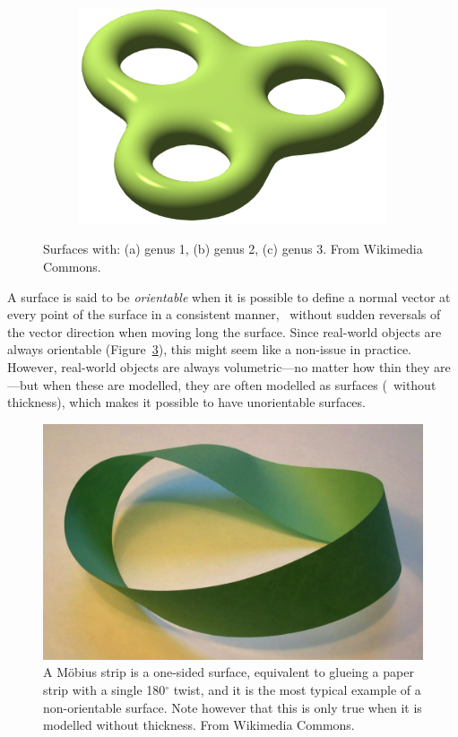 \begin{figure}
\quad
\begin{subfigure}[b]{0.3\linewidth}
\includegraphics[width=\linewidth]{figs/genus3}
\caption{}%
\label{subfig:genus3}
\end{subfigure}
\caption{Surfaces with: (a) genus 1, (b) genus 2, (c) genus 3. From Wikimedia Commons.}%
\label{fig:genus}
\end{figure}

A surface is said to be \emph{orientable} when it is possible to define a normal vector at every point of the surface in a consistent manner, \ie\ without sudden reversals of the vector direction when moving long the surface.
Since real-world objects are always orientable (Figure~\ref{fig:mobius}), this might seem like a non-issue in practice.
However, real-world objects are always volumetric---no matter how thin they are---but when these are modelled, they are often modelled as surfaces (\ie\ without thickness), which makes it possible to have unorientable surfaces.

\begin{figure}
\centering
\includegraphics[width=0.6\linewidth]{figs/mobius}
\caption{A M\"obius strip is a one-sided surface, equivalent to glueing a paper strip with a single 180\(^\circ\) twist, and it is the most typical example of a non-orientable surface. Note however that this is only true when it is modelled without thickness. From Wikimedia Commons.}%
\label{fig:mobius}
\end{figure}

